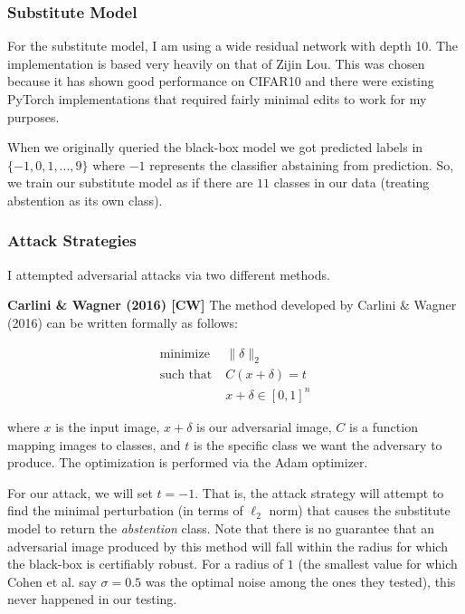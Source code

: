 \documentclass{article}
\begin{document}
\subsubsection{Substitute Model}
For the substitute model, I am using a wide residual network \cite{ZK16} with depth 10. The implementation is based very heavily on that of Zijin Lou.\cite{L18} This was chosen because it has shown good performance on CIFAR10 and there were existing PyTorch implementations that required fairly minimal edits to work for my purposes. \newline

When we originally queried the black-box model we got predicted labels in $\{ -1,0,1,...,9 \}$ where $-1$ represents the classifier abstaining from prediction. So, we train our substitute model as if there are $11$ classes in our data (treating abstention as its own class).

\subsubsection{Attack Strategies}
I attempted adversarial attacks via two different methods. \newline

\textbf{Carlini \& Wagner (2016) [CW]} \newline
The method developed by Carlini \& Wagner (2016) \cite{CW16} can be written formally as follows:

\begin{align}
    \text{minimize}  &\; \| \delta \|_2  \nonumber \\
    \text{such that} &\; C(x + \delta) = t  \nonumber \\
                     &\; x + \delta \in [0,1]^n \nonumber
\end{align}

where $x$ is the input image, $x + \delta$ is our adversarial image, $C$ is a function mapping images to classes, and $t$ is the specific class we want the adversary to produce. The optimization is performed via the Adam optimizer.\cite{KB14} \newline

For our attack, we will set $t = -1$. That is, the attack strategy will attempt to find the minimal perturbation (in terms of $\ell_2$ norm) that causes the substitute model to return the \textit{abstention} class. Note that there is no guarantee that an adversarial image produced by this method will fall within the radius for which the black-box is certifiably robust. For a radius of $1$ (the smallest value for which Cohen et al. say $\sigma = 0.5$ was the optimal noise among the ones they tested), this never happened in our testing. \newline
\end{document}
